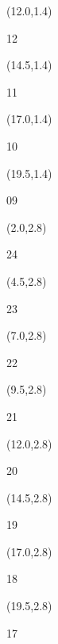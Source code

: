 \documentclass[a4paper]{article}
\newcommand{\myseat}[4]{%
\vspace{-0.1cm} \hspace{-0.5cm}
\parbox[t][2.2cm][t]{3.5cm}{%
\small #1 %
\begin{description}
\vspace{-0.1cm}
\item [ID:] #2
\vspace{-0.1cm}
\item [Team:] #3 \normalsize
\vspace{-0.1cm}
\item \normalsize #4
\vspace{-0.1cm}
\end{description}
}
}
\begin{document}
\begin{textblock}{2.5}(12.0,1.4)
\textblockcolor{}
\myseat{12}{}{}{}
\end{textblock}

\begin{textblock}{2.5}(14.5,1.4)
\textblockcolor{}
\myseat{11}{}{}{}
\end{textblock}

\begin{textblock}{2.5}(17.0,1.4)
\textblockcolor{}
\myseat{10}{}{}{}
\end{textblock}

\begin{textblock}{2.5}(19.5,1.4)
\textblockcolor{}
\myseat{09}{}{}{}
\end{textblock}


\begin{textblock}{2.5}(2.0,2.8)
\textblockcolor{}
\myseat{24}{}{}{}
\end{textblock}

\begin{textblock}{2.5}(4.5,2.8)
\textblockcolor{}
\myseat{23}{}{}{}
\end{textblock}

\begin{textblock}{2.5}(7.0,2.8)
\textblockcolor{}
\myseat{22}{}{}{}
\end{textblock}

\begin{textblock}{2.5}(9.5,2.8)
\textblockcolor{}
\myseat{21}{}{}{}
\end{textblock}

\begin{textblock}{2.5}(12.0,2.8)
\textblockcolor{}
\myseat{20}{}{}{}
\end{textblock}

\begin{textblock}{2.5}(14.5,2.8)
\textblockcolor{}
\myseat{19}{}{}{}
\end{textblock}

\begin{textblock}{2.5}(17.0,2.8)
\textblockcolor{}
\myseat{18}{}{}{}
\end{textblock}

\begin{textblock}{2.5}(19.5,2.8)
\textblockcolor{}
\myseat{17}{}{}{}
\end{textblock}
\end{document}
